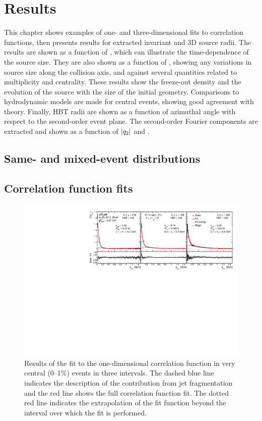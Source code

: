 \chapter{Results}
\label{ch:results}
\graphicspath{{Chapter-Results/figures/}}

This chapter shows examples of one- and three-dimensional fits to correlation functions, then presents results for extracted invariant and 3D source radii.
The results are shown as a function of \kt, which can illustrate the time-dependence of the source size.
They are also shown as a function of \kys, showing any variations in source size along the collision axis, and against several quantities related to multiplicity and centrality.
These results show the freeze-out density and the evolution of the source with the size of the initial geometry.
Comparisons to hydrodynamic models are made for central events, showing good agreement with theory.
Finally, HBT radii are shown as a function of azimuthal angle with respect to the second-order event plane.
The second-order Fourier components are extracted and shown as a function of $|q_{2}|$ and \kt.

\section{Same- and mixed-event distributions}

\section{Correlation function fits}
\begin{figure}[t]
\centering
\includegraphics[width=\linewidth]{Cqinv_kt_cent0_e3_kys1.pdf}
\caption{Results of the fit to the one-dimensional correlation function in very central (0--1\%) events in three \kt intervals.
The dashed blue line indicates the description of the contribution from jet fragmentation and the red line shows the full correlation function fit.
The dotted red line indicates the extrapolation of the fit function beyond the interval over which the fit is performed.
}
\label{fig:cqinv_cent0}
\end{figure}

